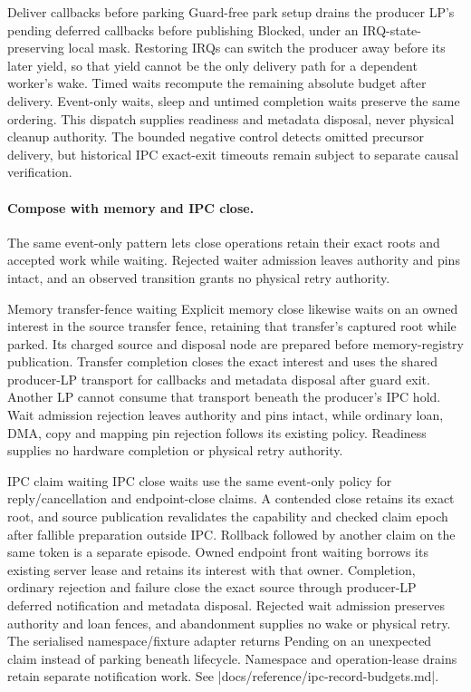 \begin{implementationdetail}{Deliver callbacks before parking}
Guard-free park setup drains the producer LP's pending deferred callbacks
before publishing Blocked, under an IRQ-state-preserving local mask. Restoring
IRQs can switch the producer away before its later yield, so that yield
cannot be the only delivery path for a dependent worker's wake. Timed waits
recompute the remaining absolute budget after delivery. Event-only waits,
sleep and untimed completion waits preserve the same ordering. This dispatch
supplies readiness and metadata disposal, never physical cleanup authority.
The bounded negative control detects omitted precursor delivery, but historical
IPC exact-exit timeouts remain subject to separate causal verification.
\end{implementationdetail}

\paragraph*{Compose with memory and IPC close.}

The same event-only pattern lets close operations retain their exact roots and
accepted work while waiting. Rejected waiter admission leaves authority and
pins intact, and an observed transition grants no physical retry authority.

\begin{implementationdetail}{Memory transfer-fence waiting}
Explicit memory close likewise waits on an owned interest in the source
transfer fence, retaining that transfer's captured root while parked. Its
charged source and disposal node are prepared before memory-registry publication.
Transfer completion closes the exact interest and uses the shared producer-LP
transport for callbacks and metadata disposal after guard exit. Another LP
cannot consume that transport beneath the producer's IPC hold. Wait admission
rejection leaves authority and pins intact, while ordinary loan, DMA, copy and mapping
pin rejection follows its existing policy. Readiness supplies no hardware
completion or physical retry authority.
\end{implementationdetail}

\begin{implementationdetail}{IPC claim waiting}
IPC close waits use the same event-only policy for reply/cancellation and
endpoint-close claims. A contended close retains its exact root, and source
publication revalidates the capability and checked claim epoch after fallible
preparation outside IPC. Rollback followed by another claim on the same token
is a separate episode. Owned endpoint front waiting borrows its existing server
lease and retains its interest with that owner. Completion, ordinary rejection
and failure close the exact source through producer-LP deferred notification and
metadata disposal. Rejected wait admission preserves authority and loan fences, and
abandonment supplies no wake or physical retry. The serialised namespace/fixture
adapter returns Pending on an unexpected claim instead of parking beneath
lifecycle. Namespace and operation-lease drains retain separate notification
work. See \repofile|docs/reference/ipc-record-budgets.md|.
\end{implementationdetail}

